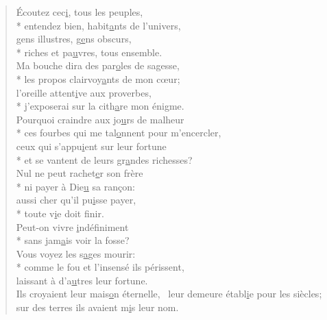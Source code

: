 
\begin{verse}
Écoutez cec\underline{i}, tous les peuples, \\*
entendez bien, habit\underline{a}nts de l’univers, \\
gens illustres, g\underline{e}ns obscurs, \\*
riches et pa\underline{u}vres, tous ensemble. \\

Ma bouche dira des par\underline{o}les de sagesse, \\*
les propos clairvoy\underline{a}nts de mon cœur; \\
l’oreille attent\underline{i}ve aux proverbes, \\*
j’exposerai sur la cith\underline{a}re mon énigme. \\

Pourquoi craindre aux jo\underline{u}rs de malheur \\*
ces fourbes qui me tal\underline{o}nnent pour m’encercler, \\
ceux qui s’appu\underline{i}ent sur leur fortune \\*
et se vantent de leurs gr\underline{a}ndes richesses? \\

Nul ne peut rachet\underline{e}r son frère \\*
ni payer à Die\underline{u} sa rançon: \\
aussi cher qu’il pu\underline{i}sse payer, \\*
toute v\underline{i}e doit finir. \\

Peut-on vivre \underline{i}ndéfiniment \\*
sans jam\underline{a}is voir la fosse? \\
Vous voyez les s\underline{a}ges mourir: \\*
comme le fou et l’insensé ils périssent, \\
laissant à d’a\underline{u}tres leur fortune. \\

Ils croyaient leur mais\underline{o}n éternelle,~\psalmdagger
leur demeure établ\underline{i}e pour les siècles; \\
sur des terres ils avaient m\underline{i}s leur nom. \\


\end{verse}
